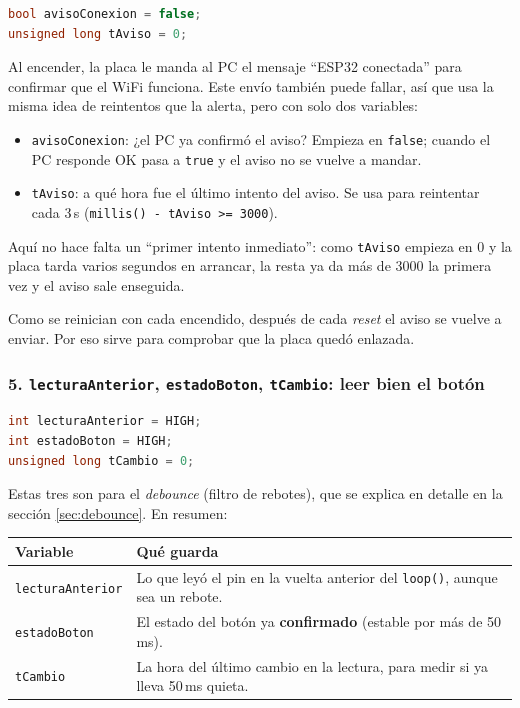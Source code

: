 \documentclass[11pt,a4paper]{article}
\begin{document}
\begin{lstlisting}[language=C++,numbers=none]
bool avisoConexion = false;
unsigned long tAviso = 0;
\end{lstlisting}

Al encender, la placa le manda al PC el mensaje ``ESP32 conectada'' para
confirmar que el WiFi funciona. Este envío también puede fallar, así que usa la
misma idea de reintentos que la alerta, pero con solo dos variables:

\begin{itemize}[leftmargin=*]
  \item \texttt{avisoConexion}: ¿el PC ya confirmó el aviso? Empieza en
        \texttt{false}; cuando el PC responde OK pasa a \texttt{true} y el aviso
        no se vuelve a mandar.
  \item \texttt{tAviso}: a qué hora fue el último intento del aviso. Se usa para
        reintentar cada 3\,s (\texttt{millis() - tAviso >= 3000}).
\end{itemize}

Aquí no hace falta un ``primer intento inmediato'': como \texttt{tAviso} empieza en
0 y la placa tarda varios segundos en arrancar, la resta ya da más de 3000 la
primera vez y el aviso sale enseguida.

Como se reinician con cada encendido, después de cada \textit{reset} el aviso se
vuelve a enviar. Por eso sirve para comprobar que la placa quedó enlazada.

\subsubsection*{5. \texttt{lecturaAnterior}, \texttt{estadoBoton}, \texttt{tCambio}: leer bien el botón}

\begin{lstlisting}[language=C++,numbers=none]
int lecturaAnterior = HIGH;
int estadoBoton = HIGH;
unsigned long tCambio = 0;
\end{lstlisting}

Estas tres son para el \textit{debounce} (filtro de rebotes), que se explica en
detalle en la sección \ref{sec:debounce}. En resumen:

\begin{center}
\begin{tabular}{@{}lp{9.3cm}@{}}
\toprule
\textbf{Variable} & \textbf{Qué guarda}\\
\midrule
\texttt{lecturaAnterior} & Lo que leyó el pin en la vuelta anterior del \texttt{loop()}, aunque sea un rebote.\\
\texttt{estadoBoton}     & El estado del botón ya \textbf{confirmado} (estable por más de 50\,ms).\\
\texttt{tCambio}         & La hora del último cambio en la lectura, para medir si ya lleva 50\,ms quieta.\\
\bottomrule
\end{tabular}
\end{center}
\end{document}
